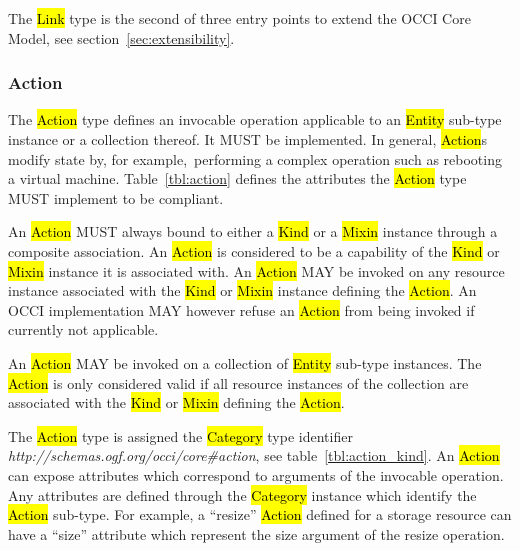 \documentclass[10pt,a4paper]{article}
\begin{document}
The \hl{Link} type is the second of three entry points to extend the OCCI Core
Model, see section~\ref{sec:extensibility}.

\subsubsection{Action}
The \hl{Action} type defines an invocable operation applicable to an \hl{Entity}
sub-type instance or a collection thereof. It MUST be implemented. In general,
\hl{Action}s modify state by, for example,~performing a complex operation such as
rebooting a virtual machine.
%
Table~\ref{tbl:action} defines the attributes the \hl{Action} type MUST
implement to be compliant.


An \hl{Action} MUST always bound to either a \hl{Kind} or a \hl{Mixin} instance
through a composite association. An \hl{Action} is considered to be a
capability of the \hl{Kind} or \hl{Mixin} instance it is associated with.  An
\hl{Action} MAY be invoked on any resource instance associated with the
\hl{Kind} or \hl{Mixin} instance defining the \hl{Action}. An OCCI
implementation MAY however refuse an \hl{Action} from being invoked if
currently not applicable.

An \hl{Action} MAY be invoked on a collection of \hl{Entity} sub-type
instances. The \hl{Action} is only considered valid if all resource instances
of the collection are associated with the \hl{Kind} or \hl{Mixin} defining the
\hl{Action}.

%
The \hl{Action} type is assigned the \hl{Category} type identifier
\textit{http://schemas.ogf.org/occi/core\#action}, see
table~\ref{tbl:action_kind}.
%
An \hl{Action} can expose attributes which correspond to arguments of the
invocable operation.  Any attributes are defined through the \hl{Category}
instance which identify the \hl{Action} sub-type. For example, a ``resize'' \hl{Action}
defined for a storage resource can have a ``size'' attribute which represent the
size argument of the resize operation.
\end{document}
